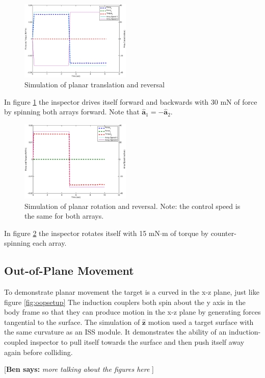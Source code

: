 \documentclass[letterpaper, 10 pt, conference]{ieeeconf}  %
\newcommand{\ben}[1]{{\color{red}\small\par {[{\bf Ben says:} {\em #1}} ] \\    }}
\begin{document}
     \begin{figure}[thpb]
      	\centering
  		\includegraphics[width = 0.47\textwidth]{figures/planar_translation_sim.eps}
      		\caption{Simulation of planar translation and reversal}
      		\label{fig:planar_translation_sim}
   \end{figure}
   
In figure \ref{fig:planar_translation_sim} the inspector drives itself forward and backwards with 30 mN of force by spinning both arrays forward. Note that $\hat{\textbf{a}}_1 = -\hat{\textbf{a}}_2$.  

     \begin{figure}[thpb]
      \centering
      \includegraphics[width = 0.47\textwidth]{figures/planar_rotations.eps}
      \caption{Simulation of planar rotation and reversal. Note: the control speed is the same for both arrays.}
      \label{fig:planar_rotation_sim}
   \end{figure}
   
In figure \ref{fig:planar_rotation_sim} the inspector rotates itself with 15 mN$\cdot$m of torque by counter-spinning each array. 

\subsection{Out-of-Plane Movement}\label{sec:oop_movement_sim}
To demonstrate planar movement the target is a curved in the x-z plane, just like figure \ref{fig:oopsetup} The induction couplers both spin about the y axis in the body frame so that they can produce motion in the x-z plane by generating forces tangential to the surface.   
The simulation of $\hat{\textbf{z}}$ motion used a target surface with the same curvature as an ISS module. It demonstrates the ability of an induction-coupled inspector to pull itself towards the surface and then push itself away again before colliding.
\ben{more talking about the figures here}
\end{document}
